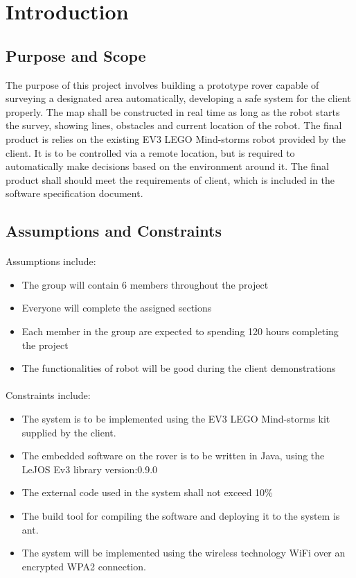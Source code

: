 \documentclass[11pt, a4paper]{article}
\begin{document}
	
	\section{Introduction}
	\subsection{Purpose and Scope}
	The purpose of this project involves building a prototype rover capable of surveying a designated area automatically, developing a safe system for the client properly. The map shall be constructed  in real time as long as the robot starts the survey, showing lines, obstacles and current location of the robot. The final product is relies on the existing EV3 LEGO Mind-storms robot provided by the client. It is to be controlled via a remote location, but is required to automatically make decisions based on the environment around it. The final product shall should meet the requirements of client, which is included in the software specification document.
	
	\subsection{Assumptions and Constraints}
	\paragraph{}
	 Assumptions include:
	\begin{itemize}
		\item The group will contain 6 members throughout the project 
		\item Everyone will complete the assigned sections 
		\item Each member in the group are expected to spending 120 hours completing the project
		\item The functionalities of robot will be good during the client demonstrations
		
	\end{itemize}
	\paragraph{}
	
	Constraints include:
	\begin{itemize}
	\item The system is to be implemented using the EV3 LEGO Mind-storms kit supplied by the client.
	\item The embedded software on the rover is to be written in Java, using the LeJOS Ev3 library version:0.9.0
	\item The external code used in the system shall not exceed 10\%
	\item The build tool for compiling the software and deploying it to the system is ant. 
	\item The system will be implemented using the wireless technology WiFi over an encrypted WPA2 connection.
	\end{itemize}
	
\end{document}
